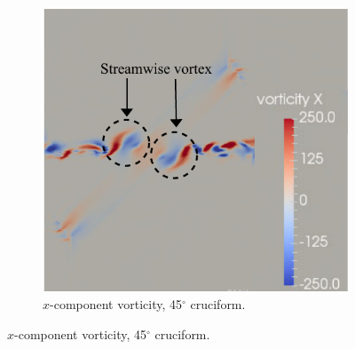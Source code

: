 \documentclass[oneside]{utmthesis}
\begin{document}
\begin{figure} \continuedfloat
  \centering
  \begin{subfigure}[h]{0.6\textwidth}
    \centering
    \includegraphics[width=\textwidth]{figs/vorx45}
    \caption{$x$-component vorticity, 45$^{\circ}$ cruciform.}
    \label{fig:vorx45}
  \end{subfigure}


\end{figure}
\end{document}
